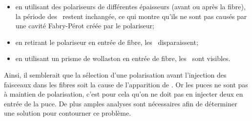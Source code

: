 \begin{itemize}
    \item en utilisant des polariseurs de différentes épaisseurs (avant ou après la fibre), la période des \wiggles~restent inchangée, ce qui montre qu'ils ne sont pas causés par une cavité Fabry-Pérot créée par le polariseur;
    \item en retirant le polariseur en entrée de fibre, les \wiggles~disparaissent;
    \item en utilisant un prisme de wollaston en entrée de fibre, les \wiggles~sont visibles.
\end{itemize}

Ainsi, il semblerait que la sélection d'une polarisation avant l'injection des faisceaux dans les fibres soit la cause de l'apparition de \wiggles. Or les puces ne sont pas à maintien de polarisation, c'est pour cela qu'on ne doit pas en injecter deux en entrée de la puce. De plus amples analyses sont nécessaires afin de déterminer une solution pour contourner ce problème.


